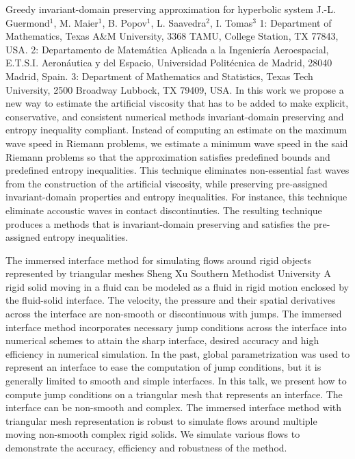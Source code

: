 \vspace{1.5ex}
\abs
{Greedy invariant-domain preserving approximation for hyperbolic system}
{J.-L. Guermond$^1$, M. Maier$^1$, B. Popov$^1$, L. Saavedra$^2$, I. Tomas$^3$}
{1: Department of Mathematics, Texas A\&M University, 3368
	TAMU, College Station, TX 77843, USA.
	2: Departamento de Matem\'atica Aplicada a la Ingenier\'ia
	Aeroespacial, E.T.S.I. Aeron\'autica y del Espacio, Universidad
	Polit\'ecnica de Madrid, 28040 Madrid, Spain.
	3: Department of Mathematics and Statistics,
	Texas Tech University, 2500 Broadway Lubbock,
	TX 79409, USA.}
{In this work we propose a new way to estimate the artificial viscosity
	that has to be added to make explicit, conservative, and consistent
	numerical methods invariant-domain preserving and entropy inequality
	compliant. Instead of computing an estimate on the maximum wave speed
	in Riemann problems, we estimate a minimum wave speed in the said
	Riemann problems so that the approximation satisfies predefined bounds
	and predefined entropy inequalities. This technique eliminates
	non-essential fast waves from the construction of the artificial
	viscosity, while preserving pre-assigned invariant-domain properties
	and entropy inequalities. For instance, this technique eliminate
	accoustic waves in contact discontinuties. The resulting technique
	produces a methods that is invariant-domain preserving and satisfies
	the pre-assigned entropy inequalities.}


\vspace{1.5ex}
\abs
{The immersed interface method for simulating flows around rigid objects represented by triangular meshes}
{Sheng Xu}
{Southern Methodist University}
{A rigid solid moving in a fluid can be modeled as a fluid in rigid motion enclosed by the fluid-solid interface.  The velocity, the pressure and their spatial derivatives across the interface are non-smooth or discontinuous with jumps. The immersed interface method incorporates necessary jump conditions across the interface into numerical schemes to attain the sharp interface, desired accuracy and high efficiency in numerical simulation. In the past, global parametrization was used to represent an interface to ease the computation of jump conditions, but it is generally limited to smooth and simple interfaces. In this talk, we present how to compute jump conditions on a triangular mesh that represents an interface. The interface can be non-smooth and complex. The immersed interface method with triangular mesh representation is robust to simulate flows around multiple moving non-smooth complex rigid solids. We simulate various flows to demonstrate the accuracy, efficiency and robustness of the method.}


